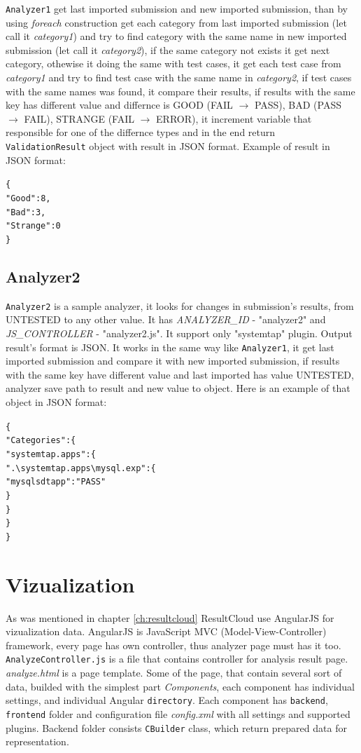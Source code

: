 \texttt{Analyzer1} get last imported submission and new imported submission, than by using \emph{foreach} construction get each category from last imported submission (let call it \emph{category1}) and try to find category with the same name in new imported submission (let call it \emph{category2}), if the same category not exists it get next category, othewise it doing the same with test cases, it get each test case from \emph{category1} and try to find test case with the same name in \emph{category2}, if test cases with the same names was found, it compare their results, if results with the same key has different value and differnce is GOOD (FAIL $\rightarrow$ PASS), BAD (PASS $\rightarrow$ FAIL), STRANGE (FAIL $\rightarrow$ ERROR), it increment variable that responsible for one of the differnce types and in the end return \texttt{ValidationResult} object with result in JSON format. Example of result in JSON format:
\begin{alltt}
\{
    "Good": 8,
    "Bad": 3,
    "Strange": 0
\}
\end{alltt}

\subsection{Analyzer2}

\texttt{Analyzer2} is a sample analyzer, it looks for changes in submission's results, from UNTESTED to any other value. It has \emph{ANALYZER\_ID} - "analyzer2" and \emph{JS\_CONTROLLER} - "analyzer2.js". It support only "systemtap" plugin. Output result's format is JSON. It works in the same way like \texttt{Analyzer1}, it get last imported submission and compare it with new imported submission, if results with the same key have different value and last imported has value UNTESTED, analyzer save path to result and new value to object. Here is an example of that object in JSON format:
\begin{alltt}
\{
    "Categories": \{
        "systemtap.apps": \{
            ".\textbackslash{}systemtap.apps\textbackslash{}mysql.exp": \{
                "mysql sdt app": "PASS"
            \}
        \}
    \}
\}
\end{alltt}

\section{Vizualization}

As was mentioned in chapter \ref{ch:resultcloud} ResultCloud use AngularJS for vizualization data. AngularJS is JavaScript MVC (Model-View-Controller) framework, every page has own controller, thus analyzer page must has it too. \texttt{AnalyzeController.js} is a file that contains controller for analysis result page. \emph{analyze.html} is a page template. Some of the page, that contain several sort of data, builded with the simplest part \emph{Components}, each component has individual settings, and individual Angular \texttt{directory}. Each component has \texttt{backend}, \texttt{frontend} folder and configuration file \emph{config.xml} with all settings and supported plugins. Backend folder consists \texttt{CBuilder} class, which return prepared data for representation. 

